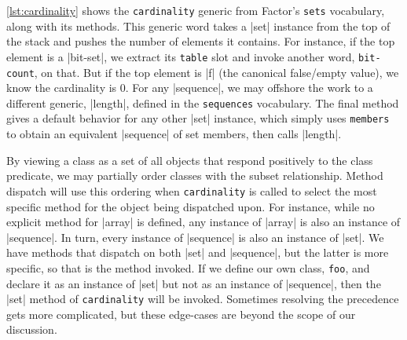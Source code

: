 
\cref{lst:cardinality} shows the \Verb|cardinality| generic from Factor's
\Verb|sets| vocabulary, along with its methods.  This generic word takes a
\factor|set| instance from the top of the stack and pushes the number of
elements it contains.  For instance, if the top element is a \factor|bit-set|,
we extract its \Verb|table| slot and invoke another word, \Verb|bit-count|,
on that.  But if the top element is \factor|f| (the canonical false/empty
value), we know the cardinality is $0$.  For any \factor|sequence|, we may
offshore the work to a different generic, \factor|length|, defined in the
\Verb|sequences| vocabulary.  The final method gives a default behavior for
any other \factor|set| instance, which simply uses \Verb|members| to obtain
an equivalent \factor|sequence| of set members, then calls \factor|length|.

By viewing a class as a set of all objects that respond positively to the class
predicate, we may partially order classes with the subset relationship.  Method
dispatch will use this ordering when \Verb|cardinality| is called to select
the most specific method for the object being dispatched upon.  For instance,
while no explicit method for \factor|array| is defined, any instance of
\factor|array| is also an instance of \factor|sequence|.  In turn, every
instance of \factor|sequence| is also an instance of \factor|set|.  We have
methods that dispatch on both \factor|set| and \factor|sequence|, but the
latter is more specific, so that is the method invoked.  If we define our own
class, \Verb|foo|, and declare it as an instance of \factor|set| but not as
an instance of \factor|sequence|, then the \factor|set| method of
\Verb|cardinality| will be invoked.  Sometimes resolving the precedence gets
more complicated, but these edge-cases are beyond the scope of our discussion.
